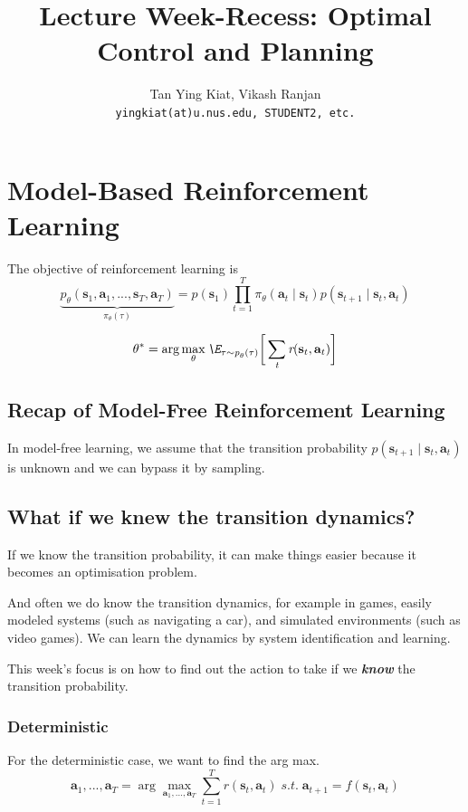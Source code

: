 \documentclass{article}
\title{Lecture Week-Recess: Optimal Control and Planning}
\author{
  Tan Ying Kiat, Vikash Ranjan \\
  \texttt{yingkiat(at)u.nus.edu, STUDENT2, etc.} \\
}
\begin{document}
\maketitle


\section{Model-Based Reinforcement Learning}
The objective of reinforcement learning is 
\begin{equation}
    \underbrace{\textit{p}_\theta(\textbf{s}_1,\textbf{a}_1,...,\textbf{s}_\textit{T},\textbf{a}_\textit{T})}
    _{\pi_\theta(\tau)} 
    = \textit{p}(\textbf{s}_1) \prod_{\textit{t}=1}^\textit{T}\pi_\theta(\textbf{a}_t\mid\textbf{s}_t)\textit{p}(\textbf{s}_{t+1}\mid\textbf{s}_t,\textbf{a}_t)
\end{equation}

\begin{equation}
    \theta^* = \arg\max_\theta \textit{\E}_{\tau\sim\textit{p}_\theta(\tau)}
    \bigg[\sum_{\textit{t}}\textit{r}(\textbf{s}_t,\textbf{a}_t)\bigg]
\end{equation}


\subsection{Recap of Model-Free Reinforcement Learning}
In model-free learning, we assume that the transition probability $\textit{p}(\textbf{s}_{t+1}\mid\textbf{s}_t,\textbf{a}_t)$
is unknown and we can bypass it by sampling. 

\subsection{What if we knew the transition dynamics?}
If we know the transition probability, it can make things easier because it becomes an optimisation problem.

And often we do know the transition dynamics, for example in games, easily modeled systems (such as navigating a car), and simulated environments (such as video games). We can learn the dynamics by system identification and learning.

This week's focus is on how to find out the action to take if we \textit{\textbf{know}} the transition probability.

\subsubsection{Deterministic}
For the deterministic case, we want to find the arg max.
\begin{equation}
    \textbf{a}_1,...,\textbf{a}_\textit{T} 
    = \arg\max_{\textbf{a}_1,...,\textbf{a}_\textit{T}}
    \sum_{\textit{t}=1}^\textit{T} \textit{r}(\textbf{s}_t,\textbf{a}_t)
    \; s.t. \; \textbf{a}_{t+1} = f(\textbf{s}_t,\textbf{a}_t)
\end{equation}
\end{document}
